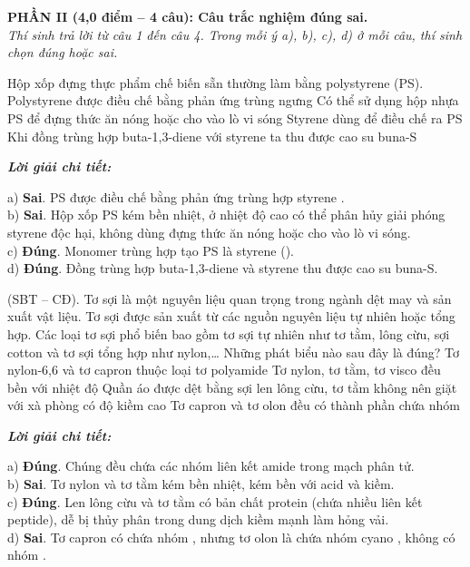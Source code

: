 \documentclass[11pt,a4paper]{article}
\def\loigiai#1{
\par\begingroup\color{blue!80!black}\small
\noindent\textbf{\textit{Lời giải chi tiết:}}\par
#1\par\endgroup}
\begin{document}
\noindent
\textbf{PHẦN II (4,0 điểm -- 4 câu): Câu trắc nghiệm đúng sai.}\\
\textit{Thí sinh trả lời từ câu 1 đến câu 4. Trong mỗi ý a), b), c), d) ở mỗi câu, thí sinh chọn đúng hoặc sai.}

\setcounter{ex}{0}

\begin{ex}
Hộp xốp đựng thực phẩm chế biến sẵn thường làm bằng polystyrene (PS).
\choiceTF
{Polystyrene được điều chế bằng phản ứng trùng ngưng}
{Có thể sử dụng hộp nhựa PS để đựng thức ăn nóng hoặc cho vào lò vi sóng}
{\True Styrene dùng để điều chế ra PS}
{\True Khi đồng trùng hợp buta-1,3-diene với styrene ta thu được cao su buna-S}
\loigiai{
a) \textbf{Sai}. PS được điều chế bằng phản ứng trùng hợp styrene \ce{C6H5-CH=CH2}.\\
b) \textbf{Sai}. Hộp xốp PS kém bền nhiệt, ở nhiệt độ cao có thể phân hủy giải phóng styrene độc hại, không dùng đựng thức ăn nóng hoặc cho vào lò vi sóng.\\
c) \textbf{Đúng}. Monomer trùng hợp tạo PS là styrene (\ce{C6H5-CH=CH2}).\\
d) \textbf{Đúng}. Đồng trùng hợp buta-1,3-diene và styrene thu được cao su buna-S.}
\end{ex}

\begin{ex}
(SBT -- CĐ). Tơ sợi là một nguyên liệu quan trọng trong ngành dệt may và sản xuất vật liệu. Tơ sợi được sản xuất từ các nguồn nguyên liệu tự nhiên hoặc tổng hợp. Các loại tơ sợi phổ biến bao gồm tơ sợi tự nhiên như tơ tằm, lông cừu, sợi cotton và tơ sợi tổng hợp như nylon,\dots{} Những phát biểu nào sau đây là đúng?
\choiceTF
{\True Tơ nylon-6,6 và tơ capron thuộc loại tơ polyamide}
{Tơ nylon, tơ tằm, tơ visco đều bền với nhiệt độ}
{\True Quần áo được dệt bằng sợi len lông cừu, tơ tằm không nên giặt với xà phòng có độ kiềm cao}
{Tơ capron và tơ olon đều có thành phần chứa nhóm }
\loigiai{
a) \textbf{Đúng}. Chúng đều chứa các nhóm liên kết amide \ce{-CO-NH-} trong mạch phân tử.\\
b) \textbf{Sai}. Tơ nylon và tơ tằm kém bền nhiệt, kém bền với acid và kiềm.\\
c) \textbf{Đúng}. Len lông cừu và tơ tằm có bản chất protein (chứa nhiều liên kết peptide), dễ bị thủy phân trong dung dịch kiềm mạnh làm hỏng vải.\\
d) \textbf{Sai}. Tơ capron có chứa nhóm \ce{-CO-NH-}, nhưng tơ olon là \ce{[-CH2-CH(CN)-]_n} chứa nhóm cyano \ce{-CN}, không có nhóm \ce{-CO-NH-}.}
\end{ex}
\end{document}
